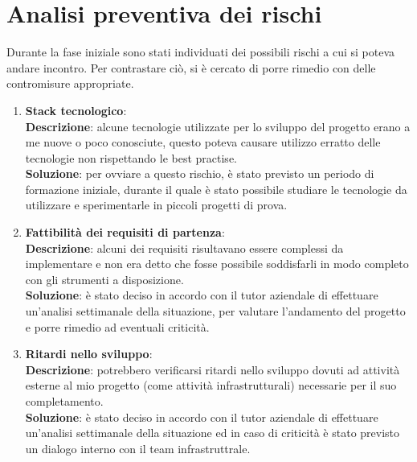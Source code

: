 \section{Analisi preventiva dei rischi}
Durante la fase iniziale sono stati individuati dei possibili rischi a cui si poteva andare incontro. Per contrastare ciò, si è cercato di porre rimedio con delle contromisure appropriate.
\begin{enumerate}
    \item \textbf{Stack tecnologico}:\\
        \textbf{Descrizione}: alcune tecnologie utilizzate per lo sviluppo del progetto erano a me nuove o poco conosciute, questo poteva causare utilizzo erratto delle tecnologie non rispettando le best practise.\\
        \textbf{Soluzione}: per ovviare a questo rischio, è stato previsto un periodo di formazione iniziale, durante il quale è stato possibile studiare le tecnologie da utilizzare e sperimentarle in piccoli progetti di prova.\\
    \item \textbf{Fattibilità dei requisiti di partenza}:\\
        \textbf{Descrizione}: alcuni dei requisiti risultavano essere complessi da implementare e non era detto che fosse possibile soddisfarli in modo completo con gli strumenti a disposizione.\\
        \textbf{Soluzione}: è stato deciso in accordo con il tutor aziendale di effettuare un'analisi settimanale della situazione, per valutare l'andamento del progetto e porre rimedio ad eventuali criticità.\\
    \item \textbf{Ritardi nello sviluppo}:\\
        \textbf{Descrizione}: potrebbero verificarsi ritardi nello sviluppo dovuti ad attività esterne al mio progetto (come attività infrastrutturali) necessarie per il suo completamento.\\
        \textbf{Soluzione}: è stato deciso in accordo con il tutor aziendale di effettuare un'analisi settimanale della situazione ed in caso di criticità è stato previsto un dialogo interno con il team infrastruttrale.\\
\end{enumerate}








